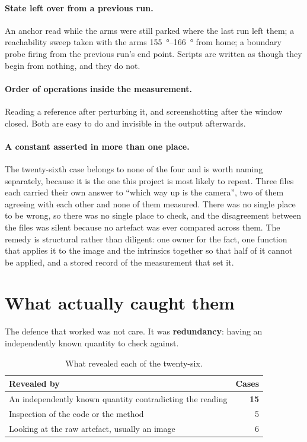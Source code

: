 \paragraph{State left over from a previous run.} An anchor read while the arms
were still parked where the last run left them; a reachability sweep taken
with the arms \SIrange{155}{166}{\degree} from home; a boundary probe firing
from the previous run's end point. Scripts are written as though they begin
from nothing, and they do not.

\paragraph{Order of operations inside the measurement.} Reading a reference
after perturbing it, and screenshotting after the window closed. Both are easy
to do and invisible in the output afterwards.

\paragraph{A constant asserted in more than one place.} The twenty-sixth case
belongs to none of the four and is worth naming separately, because it is the
one this project is most likely to repeat. Three files each carried their own
answer to ``which way up is the camera'', two of them agreeing with each other
and none of them measured. There was no single place to be wrong, so there was
no single place to check, and the disagreement between the files was silent
because no artefact was ever compared across them. The remedy is structural
rather than diligent: one owner for the fact, one function that applies it to
the image and the intrinsics together so that half of it cannot be applied,
and a stored record of the measurement that set it.

\section{What actually caught them}

The defence that worked was not care. It was \textbf{redundancy}: having an
independently known quantity to check against.

\begin{table}[htbp]
  \centering
  \caption{What revealed each of the twenty-six.}
  \label{tab:caught}
  \begin{tabular}{@{}lr@{}}
    \toprule
    Revealed by & Cases \\
    \midrule
    An independently known quantity contradicting the reading & \textbf{15} \\
    Inspection of the code or the method & 5 \\
    Looking at the raw artefact, usually an image & 6 \\
    \bottomrule
  \end{tabular}
\end{table}

